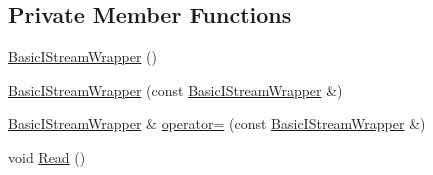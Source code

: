 \subsection*{Private Member Functions}
\begin{DoxyCompactItemize}
\item 
\mbox{\hyperlink{classrapidjson_1_1_basic_i_stream_wrapper_a8b44c77148a3770fa71560447f043b78}{Basic\+I\+Stream\+Wrapper}} ()
\item 
\mbox{\hyperlink{classrapidjson_1_1_basic_i_stream_wrapper_a0736c7200a15d6887d5b3b9abef91caf}{Basic\+I\+Stream\+Wrapper}} (const \mbox{\hyperlink{classrapidjson_1_1_basic_i_stream_wrapper}{Basic\+I\+Stream\+Wrapper}} \&)
\item 
\mbox{\hyperlink{classrapidjson_1_1_basic_i_stream_wrapper}{Basic\+I\+Stream\+Wrapper}} \& \mbox{\hyperlink{classrapidjson_1_1_basic_i_stream_wrapper_a5d6ec3d7776d701bce59a2d1277f7e93}{operator=}} (const \mbox{\hyperlink{classrapidjson_1_1_basic_i_stream_wrapper}{Basic\+I\+Stream\+Wrapper}} \&)
\item 
void \mbox{\hyperlink{classrapidjson_1_1_basic_i_stream_wrapper_ae4076aa45a6de62d24b02843d8f7bb9e}{Read}} ()
\end{DoxyCompactItemize}
